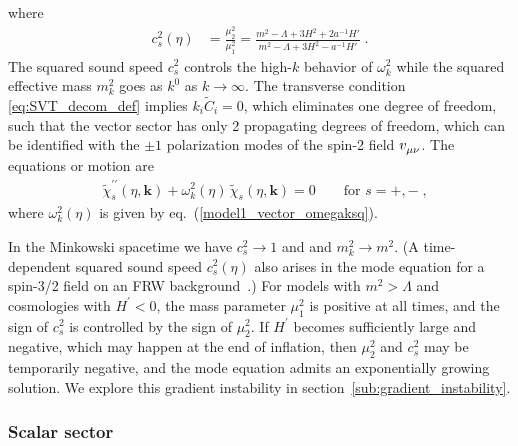 \documentclass[11pt,a4paper]{article}
\newcommand{\ba}[1]{\begin{align} #1 \end{align}}
\newcommand{\bes}[1]{\begin{equation}\begin{split} #1 \end{split}\end{equation}}
\newcommand{\kvec}{{\bm k}}
\newcommand{\sref}[1]{section~\ref{#1}}
\newcommand{\eref}[1]{eq.~(\ref{#1})}
\begin{document}
where 
\ba{\label{eq:cs_mk_def}
	c_s^2(\eta) 
	& = \frac{\mu_2^2}{\mu_1^2} 
	= \frac{m^2 - \Lambda + 3 H^2 + 2 a^{-1} H'}{m^2 - \Lambda + 3 H^2 - a^{-1} H'} 
	\;.
}
The squared sound speed $c_s^2$ controls the high-$k$ behavior of $\omega_k^2$ while the squared effective mass $m_k^2$ goes as $k^0$ as $k \to \infty$.  The transverse condition \eqref{eq:SVT_decom_def} implies $k_i \tilde{C}_i = 0$, which eliminates one degree of freedom, such that the vector sector has only 2 propagating degrees of freedom, which can be identified with the $\pm 1$ polarization modes of the spin-2 field $v\indices{_\mu_\nu}$.  The equations or motion are 
\bes{\label{eq:model2_vector_mode_eqn}
    & \tilde{\chi}_s^{\prime\prime}(\eta,\kvec) + \omega_k^2(\eta) \, \tilde{\chi}_s(\eta,\kvec) = 0 \qquad \text{for $s = +,-$} 
    \;,
}
where $\omega_k^2(\eta)$ is given by \eref{model1_vector_omegaksq}.  

In the Minkowski spacetime we have $c_s^2 \to 1$ and and $m_k^2 \to m^2$.  (A time-dependent squared sound speed $c_s^2(\eta)$ also arises in the mode equation for a spin-3/2 field on an FRW background~\cite{Hasegawa:2017hgd,Kolb:2021xfn}.)   For models with $m^2 > \Lambda$ and cosmologies with $H^\prime < 0$, the mass parameter $\mu_1^2$ is positive at all times, and the sign of $c_s^2$ is controlled by the sign of $\mu_2^2$.  If $H^\prime$ becomes sufficiently large and negative, which may happen at the end of inflation, then $\mu_2^2$ and $c_s^2$ may be temporarily negative, and the mode equation admits an exponentially growing solution.  We explore this gradient instability in \sref{sub:gradient_instability}. 

\subsubsection{Scalar sector}
\label{sub:model2_scalar_sector}
\end{document}
